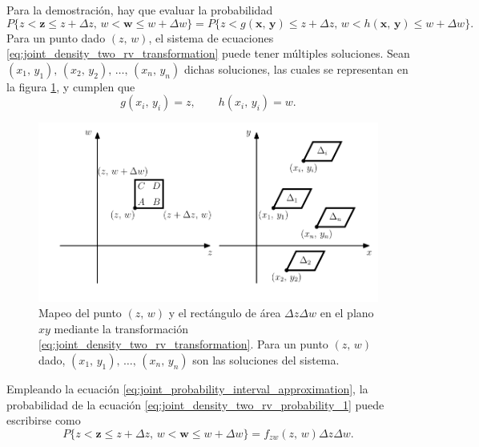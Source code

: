 \documentclass[a4paper]{report}
\newcommand{\x}{\mathbf{x}}
\newcommand{\y}{\mathbf{y}}
\newcommand{\w}{\mathbf{w}}
\newcommand{\z}{\mathbf{z}}
\begin{document}
Para la demostración, hay que evaluar la probabilidad
\begin{equation}\label{eq:joint_density_two_rv_probability_1}
 P\{z<\z\leq z+\Delta z,\,w<\w\leq w+\Delta w\}=P\{z<g(\x,\,\y)\leq z+\Delta z,\,w<h(\x,\,\y)\leq w+\Delta w\}.
\end{equation}
\sloppy Para un punto dado \((z,\,w)\), el sistema de ecuaciones \ref{eq:joint_density_two_rv_transformation} puede tener múltiples soluciones. Sean \((x_1,\,y_1),\,(x_2,\,y_2),\,\dots,\,(x_n,\,y_n)\) dichas soluciones, las cuales se representan en la figura \ref{fig:fzw_as_function_of_fxy_1}, y cumplen que
\[
 g(x_i,\,y_i)=z,\qquad h(x_i,\,y_i)=w.
\]
\begin{figure}[!htb]
\begin{center}
 \includegraphics[width=0.8\columnwidth]{figuras/fzw_as_function_of_fxy_1.pdf}
\caption{Mapeo del punto \((z,\,w)\) y el rectángulo de área \(\Delta z\Delta w\) en el plano \(xy\) mediante la transformación \ref{eq:joint_density_two_rv_transformation}. Para un punto \((z,\,w)\) dado, \((x_1,\,y_1),\,\dots,\,(x_n,\,y_n)\) son las soluciones del sistema.}\label{fig:fzw_as_function_of_fxy_1}
\end{center}
\end{figure}
Empleando la ecuación \ref{eq:joint_probability_interval_approximation}, la probabilidad de la ecuación \ref{eq:joint_density_two_rv_probability_1} puede escribirse como
\begin{equation}\label{eq:joint_density_two_rv_probability_zw}
 P\{z<\z\leq z+\Delta z,\,w<\w\leq w+\Delta w\}=f_{zw}(z,\,w)\Delta z\Delta w. 
\end{equation}
\end{document}
